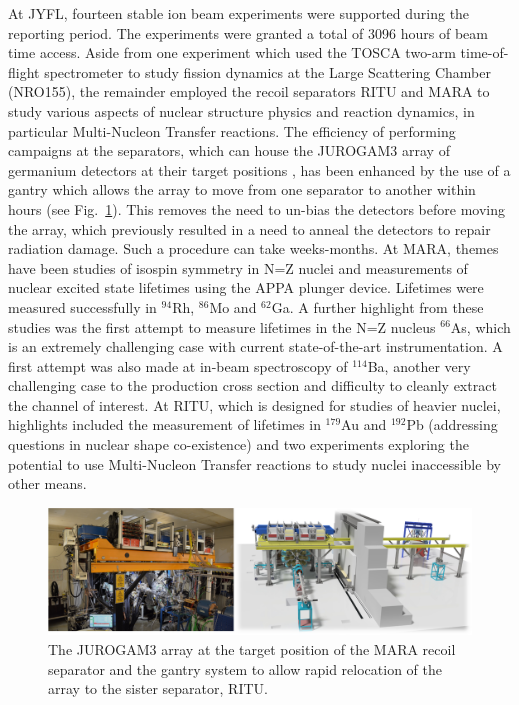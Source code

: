 At JYFL, fourteen stable ion beam experiments were supported during the reporting period. The experiments were granted a total of 3096 hours of beam time access. Aside from one experiment which used the TOSCA two-arm time-of-flight spectrometer to study fission dynamics at the Large Scattering Chamber (NRO155), the remainder employed the recoil separators RITU and MARA to study various aspects of nuclear structure physics and reaction dynamics, in particular Multi-Nucleon Transfer reactions. The efficiency of performing campaigns at the separators, which can house the JUROGAM3 array of germanium detectors at their target positions , has been enhanced by the use of a gantry which allows the array to move from one separator to another within hours (see Fig.~\ref{fig:Jurogam3}). This removes the need to un-bias the detectors before moving the array, which previously resulted in a need to anneal the detectors to repair radiation damage. Such a procedure can take weeks-months. At MARA, themes have been studies of isospin symmetry in N=Z nuclei and measurements of nuclear excited state lifetimes using the APPA plunger device. Lifetimes were measured successfully in $^{94}$Rh, $^{86}$Mo and $^{62}$Ga. A further highlight from these studies was the first attempt to measure lifetimes in the N=Z nucleus $^{66}$As, which is an extremely challenging case with current state-of-the-art instrumentation. A first attempt was also made at in-beam spectroscopy of $^{114}$Ba, another very challenging case to the production cross section and difficulty to cleanly extract the channel of interest. At RITU, which is designed for studies of heavier nuclei, highlights included the measurement of lifetimes in $^{179}$Au and $^{192}$Pb (addressing questions in nuclear shape co-existence) and two experiments exploring the potential to use Multi-Nucleon Transfer reactions to study nuclei inaccessible by other means.

\begin{figure}[!h]
    \centering
    \includegraphics[width=1.0\linewidth]{graphics/Jurogam3.png}
    \caption{The JUROGAM3 array at the target position of the MARA recoil separator and the gantry system to allow rapid relocation of the array to the sister separator, RITU.}
    \label{fig:Jurogam3}
\end{figure}


